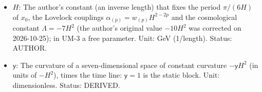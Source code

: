 \documentclass[
  10pt,
]{article}
\begin{document}
\begin{itemize}
  gravitons \(\sqrt5\) times faster than light; they were corrected at
  the author's order of 2026-10-25. Unit: dimensionless. Value:
  \((1, 1/20, 1/360)\); the author's original \((1, 1/32, 1/1152)\).
  Status: AUTHOR (the form), ASSUMED (the criterion of the correction),
  DERIVED (the unique values that meet it).
\item
  \(H\): The author's constant (an inverse length) that fixes the period
  \(\pi/(6H)\) of \(x_0\), the Lovelock couplings
  \(\alpha_{(p)} = w_{(p)}H^{2-2p}\) and the cosmological constant
  \(\Lambda = -7H^2\) (the author's original value \(-10H^2\) was
  corrected on 2026-10-25); in UM-3 a free parameter. Unit: GeV
  (1/length). Status: AUTHOR.
\item
  \(\mathsf{y}\): The curvature of a seven-dimensional space of constant
  curvature \(-\mathsf{y}H^2\) (in units of \(-H^2\)), times the time
  line: \(\mathsf{y} = 1\) is the static block. Unit: dimensionless.
  Status: DERIVED.
\end{itemize}
\end{document}
